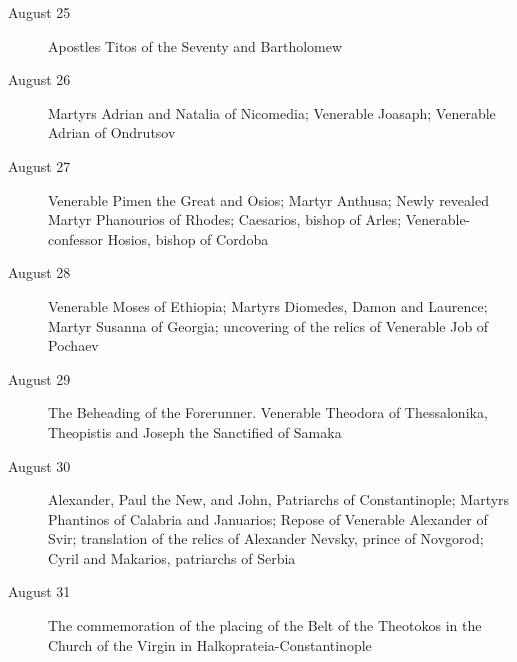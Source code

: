\begin{description}
\item[August 25]

Apostles Titos of the Seventy and Bartholomew

\item[August 26]

Martyrs Adrian and Natalia of Nicomedia; Venerable Joasaph; Venerable Adrian of Ondrutsov

\item[August 27]

Venerable Pimen the Great and Osios; Martyr Anthusa; Newly revealed Martyr Phanourios of Rhodes; Caesarios, bishop of Arles; Venerable-confessor Hosios, bishop of Cordoba

\item[August 28]

Venerable Moses of Ethiopia; Martyrs Diomedes, Damon and Laurence; Martyr Susanna of Georgia; uncovering of the relics of Venerable Job of Pochaev

\item[August 29]

The Beheading of the Forerunner. Venerable Theodora of Thessalonika, Theopistis and Joseph the Sanctified of Samaka

\item[August 30]

Alexander, Paul the New, and John, Patriarchs of Constantinople; Martyrs Phantinos of Calabria and Januarios; Repose of Venerable Alexander of Svir; translation of the relics of Alexander Nevsky, prince of Novgorod; Cyril and Makarios, patriarchs of Serbia

\item[August 31]

The commemoration of the placing of the Belt of the Theotokos in the Church of the Virgin in Halkoprateia-Constantinople

\end{description}

